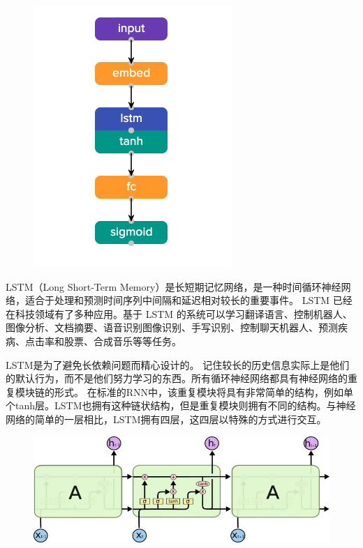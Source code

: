 \documentclass{progbookcn}
\begin{document}
\begin{figure}

\vspace{-0.9cm}
\includegraphics[scale = 0.5]{lstm.png}

\end{figure}
LSTM（Long Short-Term Memory）是长短期记忆网络，是一种时间循环神经网络，适合于处理和预测时间序列中间隔和延迟相对较长的重要事件。 LSTM 已经在科技领域有了多种应用。基于 LSTM 的系统可以学习翻译语言、控制机器人、图像分析、文档摘要、语音识别图像识别、手写识别、控制聊天机器人、预测疾病、点击率和股票、合成音乐等等任务。

LSTM是为了避免长依赖问题而精心设计的。 记住较长的历史信息实际上是他们的默认行为，而不是他们努力学习的东西。所有循环神经网络都具有神经网络的重复模块链的形式。 在标准的RNN中，该重复模块将具有非常简单的结构，例如单个tanh层。LSTM也拥有这种链状结构，但是重复模块则拥有不同的结构。与神经网络的简单的一层相比，LSTM拥有四层，这四层以特殊的方式进行交互。
\begin{figure}[H]
  \centering
  \includegraphics[scale = 0.4]{lstm_show.jpg}
\end{figure}
\end{document}
